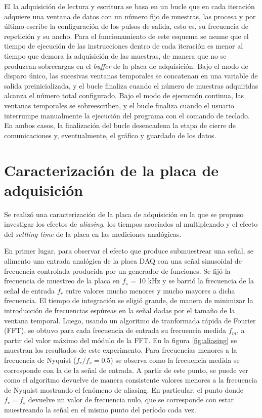 \documentclass[a4paper,11pt]{article}
\begin{document}
	El la adquisición de lectura y escritura se basa en un bucle que en cada iteración adquiere una ventana de datos con un número fijo de muestras, las procesa y por último escribe la configuración de los pulsos de salida, esto es, su frecuencia de repetición y su ancho. Para el funcionamiento de este esquema se asume que el tiempo de ejecución de las instrucciones dentro de cada iteración es menor al tiempo que demora la adquisición de las muestras, de manera que no se produzcan sobrecargas en el \emph{buffer} de la placa de adquisición. Bajo el modo de disparo único, las sucesivas ventanas temporales se concatenan en una variable de salida preinicializada, y el bucle finaliza cuando el número de muestras adquiridas alcanza el número total configurado. Bajo el modo de ejecucuón continua, las ventanas temporales se sobreescriben, y el bucle finaliza cuando el usuario interrumpe manualmente la ejecución del programa con el comando de teclado. En ambos casos, la finalización del bucle desencadena la etapa de cierre de comunicaciones y, eventualmente, el gráfico y guardado de los datos.	

\section{Caracterización de la placa de adquisición}
\label{sec:daq}

Se realizó una caracterización de la placa de adquisición en la que se propuso investigar los efectos de \textit{aliasing}, los tiempos asociados al multiplexado y el efecto del \textit{settling time} de la placa en las mediciones analógicas. 

En primer lugar, para observar el efecto que produce submuestrear una señal, se alimento una entrada analógica de la placa DAQ con una señal sinusoidal de frecuencia controlada producida por un generador de funciones. Se fijó la frecuencia de muestreo de la placa en $f_s$ = 10 kHz y se barrió la frecuencia de la señal de entrada $f_r$ entre valores mucho menores y mucho mayores a dicha frecuencia. El tiempo de integración se eligió grande, de manera de minimizar la introducción de frecuencias espúreas en la señal dadas por el tamaño de la ventana temporal. Luego, usando un algoritmo de tranformada rápida de Fourier (FFT), se obtuvo para cada frecuencia de entrada su frecuencia medida $f_m$, a partir del valor máximo del módulo de la FFT. En la figura \ref{fig:aliasing} se muestran los resultados de este experimento. Para frecuencias menores a la frecuencia de Nyquist ($f_r/f_s = 0.5$) se observa como la frecuencia medida se corresponde con la de la señal de entrada. A partir de este punto, se puede ver como el algoritmo devuelve de manera consistente valores menores a la frecuencia de Nyquist mostrando el fenómeno de aliasing. En particular, el punto donde $f_r = f_s$ devuelve un valor de frecuencia nulo, que se corresponde con estar muestreando la señal en el mismo punto del período cada vez.
\end{document}
